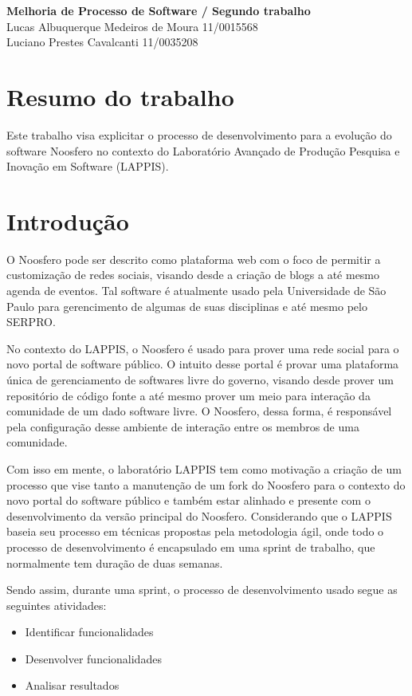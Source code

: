 \documentclass[a4paper, 11pt]{article}
\begin{document}
\noindent
\large\textbf{Melhoria de Processo de Software / Segundo trabalho}\\
Lucas Albuquerque Medeiros de Moura \hfill 11/0015568 \\
Luciano Prestes Cavalcanti \hfill 11/0035208

\section*{Resumo do trabalho}

Este trabalho visa explicitar o processo de desenvolvimento para a evolução do
software Noosfero no contexto do Laboratório Avançado de Produção Pesquisa e
Inovação em Software (LAPPIS).

\section*{Introdução}

O Noosfero pode ser descrito como plataforma web com o foco de permitir a
customização de redes sociais, visando desde a criação de blogs a até mesmo
agenda de eventos. Tal software é atualmente usado pela Universidade de São
Paulo para gerencimento de algumas de suas disciplinas e até mesmo pelo
SERPRO.

No contexto do LAPPIS, o Noosfero é usado para prover uma rede social para o
novo portal de software público. O intuito desse portal é provar uma
plataforma única de gerenciamento de softwares livre do governo, visando desde
prover um repositório de código fonte a até mesmo prover um meio para
interação da comunidade de um dado software livre. O Noosfero, dessa forma, é
responsável pela configuração desse ambiente de interação entre os membros de
uma comunidade.

Com isso em mente, o laboratório LAPPIS tem como motivação a criação de um
processo que vise tanto a manutenção de um fork do Noosfero para o contexto do
novo portal do software público e também estar alinhado e presente com o
desenvolvimento da versão principal do Noosfero. Considerando que o LAPPIS
baseia seu processo em técnicas propostas pela metodologia ágil, onde todo o
processo de desenvolvimento é encapsulado em uma sprint de trabalho, que
normalmente tem duração de duas semanas.

Sendo assim, durante uma sprint, o processo de desenvolvimento usado segue as
seguintes atividades:

\begin{itemize}
    \item Identificar funcionalidades
    \item Desenvolver funcionalidades
    \item Analisar resultados
\end{itemize}
\end{document}
